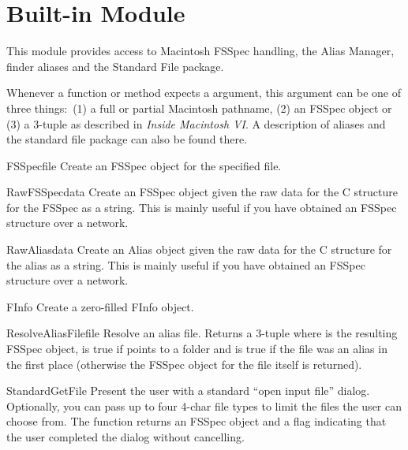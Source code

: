 \section{Built-in Module }
\label{module-macfs}


This module provides access to Macintosh FSSpec handling, the Alias
Manager, finder aliases and the Standard File package.

Whenever a function or method expects a  argument, this
argument can be one of three things:\ (1) a full or partial Macintosh
pathname, (2) an FSSpec object or (3) a 3-tuple  as described in \emph{Inside Macintosh
VI}\@. A description of aliases and the standard file package can also
be found there.

\begin{funcdesc}{FSSpec}{file}
Create an FSSpec object for the specified file.
\end{funcdesc}

\begin{funcdesc}{RawFSSpec}{data}
Create an FSSpec object given the raw data for the C structure for the
FSSpec as a string.  This is mainly useful if you have obtained an
FSSpec structure over a network.
\end{funcdesc}

\begin{funcdesc}{RawAlias}{data}
Create an Alias object given the raw data for the C structure for the
alias as a string.  This is mainly useful if you have obtained an
FSSpec structure over a network.
\end{funcdesc}

\begin{funcdesc}{FInfo}{}
Create a zero-filled FInfo object.
\end{funcdesc}

\begin{funcdesc}{ResolveAliasFile}{file}
Resolve an alias file. Returns a 3-tuple  where  is the resulting FSSpec object,
 is true if  points to a folder and
 is true if the file was an alias in the first place
(otherwise the FSSpec object for the file itself is returned).
\end{funcdesc}

\begin{funcdesc}{StandardGetFile}{}
Present the user with a standard ``open input file''
dialog. Optionally, you can pass up to four 4-char file types to limit
the files the user can choose from. The function returns an FSSpec
object and a flag indicating that the user completed the dialog
without cancelling.
\end{funcdesc}

